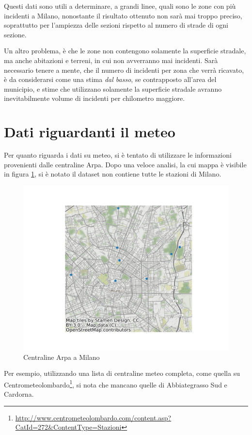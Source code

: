 \documentclass[a4paper,12pt]{report}
\newcommand{\quotestyle}[1]{\textit{#1}}
\begin{document}
Questi dati sono utili a determinare, a grandi linee, quali sono le zone con più incidenti 
a Milano, nonostante il risultato ottenuto non sarà mai troppo preciso, soprattutto 
per l'ampiezza delle sezioni rispetto al numero di strade di ogni sezione.

Un altro problema, è che le zone non contengono solamente la superficie stradale, ma anche 
abitazioni e terreni, in cui non avverranno mai incidenti.
Sarà necessario tenere a mente, che il numero di incidenti per zona che verrà ricavato, 
è da considerarsi come una stima \quotestyle{dal basso}, se contrapposto all'area del municipio, 
e stime che utilizzano solamente la superficie stradale avranno inevitabilmente volume 
di incidenti per chilometro maggiore.

\section{Dati riguardanti il meteo}

Per quanto riguarda i dati su meteo, si è tentato di utilizzare le informazioni 
provenienti dalle centraline Arpa. 
Dopo una veloce analisi, la cui mappa è visibile in figura \ref{fig:centraline-arpa}, 
si è notato il dataset non contiene tutte le stazioni di Milano.

\begin{figure}
    \hfill\includegraphics[width=0.7\linewidth]{../src/meteo/centraline_arpa.png}\hspace*{\fill}
    \caption{Centraline Arpa a Milano}
    \label{fig:centraline-arpa}
\end{figure}

Per esempio, utilizzando una lista di centraline meteo completa, come quella su 
Centrometeolombardo\footnote{\url{http://www.centrometeolombardo.com/content.asp?CatId=272&ContentType=Stazioni}}, 
si nota che mancano quelle di Abbiategrasso Sud e Cardorna.
\end{document}
